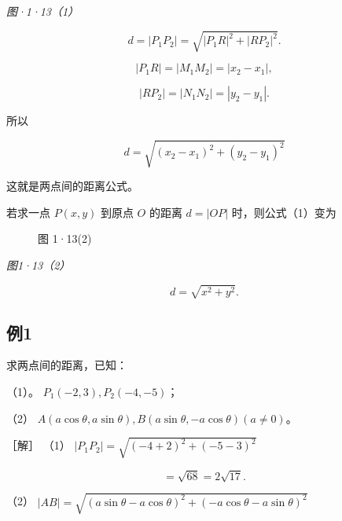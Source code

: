 \emph{图·1·13（1）}

\[
d = \left| P_{1} P_{2} \right| = \sqrt {\left| P_{1} R \right| ^ {2} + \left| RP_{2} \right| ^ {2}}.
\]

\[
\left| P_{1} R \right| = \left| M_{1} M_{2} \right| = \left| x_{2} - x_{1} \right|,
\]

\[
\left| RP_{2} \right| = \left| N_{1} N_{2} \right| = \left| y_{2} - y_{1} \right|.
\]

所以

\[
d = \sqrt {\left(x_{2} - x_{1}\right) ^ {2} + \left(y_{2} - y_{1}\right) ^ {2}} \tag {1}
\]

这就是两点间的距离公式。

若求一点 \(P(x, y)\) 到原点 \(O\) 的距离 \(d = |OP|\)
时，则公式（1）变为

\begin{figure}
\centering
{}
\caption{图 1·13(2)}
\end{figure}

\emph{图1·13（2）}

\[
d = \sqrt {x^{2} + y^{2}}.
\]

\subsection{例1}\label{ux4f8b1-2}

求两点间的距离，已知：

（1）。 \(P_{1}(-2,3), P_{2}(-4,-5)\)；

（2）
\(A(a\cos \theta, a\sin \theta), B(a\sin \theta, -a\cos \theta) (a \neq 0)\)。

［解］ （1） \(\left|P_{1}P_{2}\right|=\sqrt{(-4+2)^{2}+(-5-3)^{2}}\)

\[
= \sqrt {68} = 2 \sqrt {17}.
\]

（2）
\(|AB| = \sqrt{(a\sin\theta - a\cos\theta)^2 + (-a\cos\theta - a\sin\theta)^2}\)


